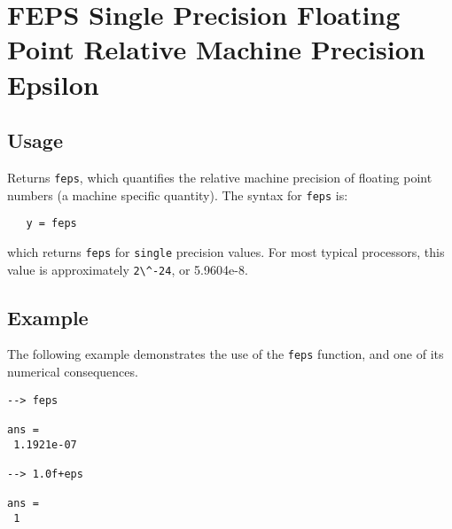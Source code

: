 \section{FEPS Single Precision Floating Point Relative Machine Precision Epsilon}

\subsection{Usage}

Returns \verb|feps|, which quantifies the relative machine precision
of floating point numbers (a machine specific quantity).  The syntax
for \verb|feps| is:
\begin{verbatim}
   y = feps
\end{verbatim}
which returns \verb|feps| for \verb|single| precision values. For most
typical processors, this value is approximately \verb|2\^-24|, or 5.9604e-8.
\subsection{Example}

The following example demonstrates the use of the \verb|feps| function,
and one of its numerical consequences.
\begin{verbatim}
--> feps

ans = 
 1.1921e-07 

--> 1.0f+eps

ans = 
 1 
\end{verbatim}
